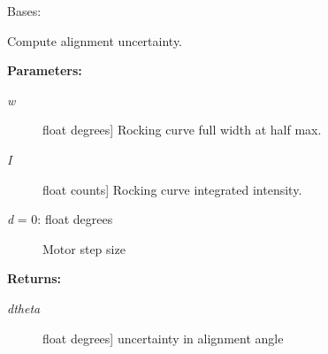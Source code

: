 \documentclass[letterpaper,10pt,english]{sphinxmanual}
\begin{document}
\begin{fulllineitems}
\label{api/probe:refl1d.probe.ProbeSet}
Bases: {\hyperref[api/probe:refl1d.probe.Probe]{}}

\begin{fulllineitems}
\label{api/probe:refl1d.probe.ProbeSet.Q}
\end{fulllineitems}


\begin{fulllineitems}
\label{api/probe:refl1d.probe.ProbeSet.alignment_uncertainty}
Compute alignment uncertainty.

\textbf{Parameters:}
\begin{description}
\item[{\emph{w}}] \leavevmode{[}float \textbar{} degrees{]}
Rocking curve full width at half max.

\item[{\emph{I}}] \leavevmode{[}float \textbar{} counts{]}
Rocking curve integrated intensity.

\item[{\emph{d} = 0: float \textbar{} degrees}] \leavevmode
Motor step size

\end{description}

\textbf{Returns:}
\begin{description}
\item[{\emph{dtheta}}] \leavevmode{[}float \textbar{} degrees{]}
uncertainty in alignment angle

\end{description}

\end{fulllineitems}


\begin{fulllineitems}
\label{api/probe:refl1d.probe.ProbeSet.apply_beam}
\end{fulllineitems}


\end{fulllineitems}
\end{document}

